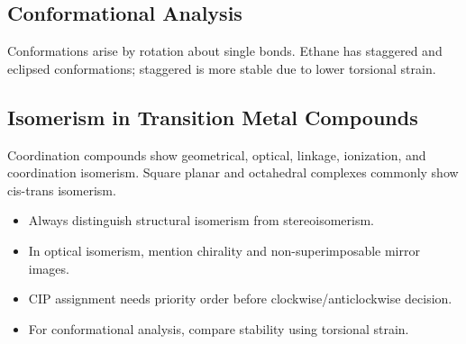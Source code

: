 \documentclass[12pt,a4paper]{article}
\begin{document}
\subsection{Conformational Analysis}
Conformations arise by rotation about single bonds. Ethane has staggered and eclipsed conformations; staggered is more stable due to lower torsional strain.

\begin{tcolorbox}[tikzbox, title={Ethane Conformations: Staggered and Eclipsed}]
\centering
{}
\end{tcolorbox}

\subsection{Isomerism in Transition Metal Compounds}
Coordination compounds show geometrical, optical, linkage, ionization, and coordination isomerism. Square planar and octahedral complexes commonly show cis-trans isomerism.

\begin{tcolorbox}[exambox, title={Exam Points}]
\begin{itemize}[leftmargin=*, itemsep=2pt, topsep=2pt]
  \item Always distinguish structural isomerism from stereoisomerism.
  \item In optical isomerism, mention chirality and non-superimposable mirror images.
  \item CIP assignment needs priority order before clockwise/anticlockwise decision.
  \item For conformational analysis, compare stability using torsional strain.
\end{itemize}
\end{tcolorbox}

\end{document}
